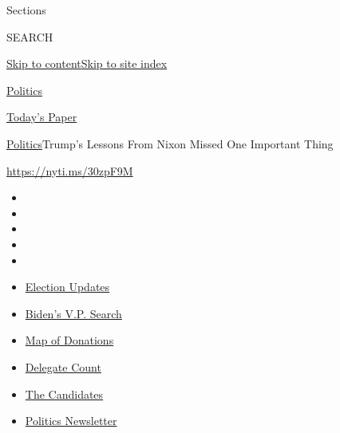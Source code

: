Sections

SEARCH

\protect\hyperlink{site-content}{Skip to
content}\protect\hyperlink{site-index}{Skip to site index}

\href{https://www.nytimes.com/section/politics}{Politics}

\href{https://myaccount.nytimes.com/auth/login?response_type=cookie\&client_id=vi}{}

\href{https://www.nytimes.com/section/todayspaper}{Today's Paper}

\href{/section/politics}{Politics}\textbar{}Trump's Lessons From Nixon
Missed One Important Thing

\url{https://nyti.ms/30zpF9M}

\begin{itemize}
\item
\item
\item
\item
\item
\end{itemize}

\begin{itemize}
\item
  \href{https://www.nytimes.com/2020/07/31/us/elections/biden-vs-trump.html?action=click\&pgtype=Article\&state=default\&region=TOP_BANNER\&context=storylines_menu}{Election
  Updates}
\item
  \href{https://www.nytimes.com/article/biden-vice-president-2020.html?action=click\&pgtype=Article\&state=default\&region=TOP_BANNER\&context=storylines_menu}{Biden's
  V.P. Search}
\item
  \href{https://www.nytimes.com/interactive/2020/07/24/us/politics/trump-biden-campaign-donors.html?action=click\&pgtype=Article\&state=default\&region=TOP_BANNER\&context=storylines_menu}{Map
  of Donations}
\item
  \href{https://www.nytimes.com/interactive/2020/us/elections/delegate-count-primary-results.html?action=click\&pgtype=Article\&state=default\&region=TOP_BANNER\&context=storylines_menu}{Delegate
  Count}
\item
  \href{https://www.nytimes.com/interactive/2019/us/politics/2020-presidential-candidates.html?action=click\&pgtype=Article\&state=default\&region=TOP_BANNER\&context=storylines_menu}{The
  Candidates}
\item
  \href{https://www.nytimes.com/newsletters/politics?action=click\&pgtype=Article\&state=default\&region=TOP_BANNER\&context=storylines_menu}{Politics
  Newsletter}
\end{itemize}

